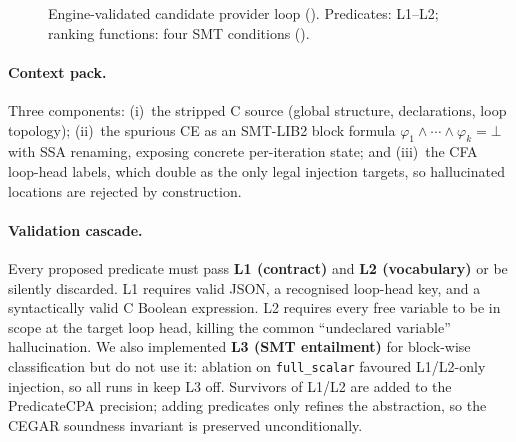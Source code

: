 \documentclass[runningheads]{llncs}
\begin{document}
\begin{figure}[t]
\centering
{}
\caption{Engine-validated candidate provider loop (). Predicates: L1--L2;
ranking functions: four SMT conditions ().}
\label{fig:pipeline}
\end{figure}

\paragraph{Context pack.} Three components: (i)~the stripped C source (global structure,
declarations, loop topology); (ii)~the spurious CE as an SMT-LIB2 block formula
$\varphi_1\wedge\cdots\wedge\varphi_k=\bot$ with SSA renaming, exposing concrete per-iteration
state; and (iii)~the CFA loop-head labels, which double as the only legal injection targets,
so hallucinated locations are rejected by construction.

\paragraph{Validation cascade.} Every proposed predicate must pass \textbf{L1 (contract)}
and \textbf{L2 (vocabulary)} or be silently discarded. L1 requires valid JSON, a recognised
loop-head key, and a syntactically valid C Boolean expression. L2 requires every free variable
to be in scope at the target loop head, killing the common ``undeclared variable'' hallucination.
We also implemented \textbf{L3 (SMT entailment)} for block-wise classification but do not use it:
ablation on \texttt{full\_scalar} favoured L1/L2-only injection, so all runs in  keep
L3 off. Survivors of L1/L2 are added to the PredicateCPA precision; adding predicates only refines the
abstraction, so the CEGAR soundness invariant is preserved unconditionally.
\end{document}

